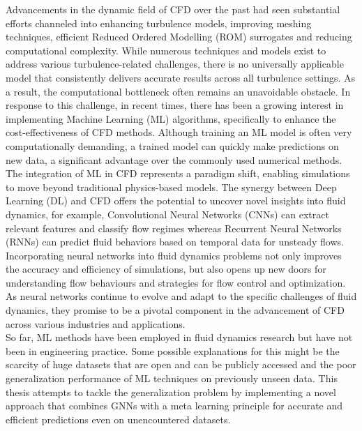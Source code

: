 Advancements in the dynamic field of CFD over the past had seen substantial efforts channeled into enhancing turbulence models, improving meshing techniques, efficient Reduced Ordered Modelling (ROM) surrogates and reducing computational complexity. While numerous techniques and models exist to address various turbulence-related challenges, there is no universally applicable model that consistently delivers accurate results across all turbulence settings. As a result, the computational bottleneck often remains an unavoidable obstacle. In response to this challenge, in recent times, there has been a growing interest in implementing Machine Learning (ML) algorithms, specifically to enhance the cost-effectiveness of CFD methods. Although training an ML model is often very computationally demanding, a trained model can quickly make predictions on new data, a significant advantage over the commonly used numerical methods. The integration of ML in CFD represents a paradigm shift, enabling simulations to move beyond traditional physics-based models. The synergy between Deep Learning (DL) and CFD offers the potential to uncover novel insights into fluid dynamics, for example, Convolutional Neural Networks (CNNs) can extract relevant features and classify flow regimes whereas Recurrent Neural Networks (RNNs) can predict fluid behaviors based on temporal data for unsteady flows. Incorporating neural networks into fluid dynamics problems not only improves the accuracy and efficiency of simulations, but also opens up new doors for understanding flow behaviours and strategies for flow control and optimization. As neural networks continue to evolve and adapt to the specific challenges of fluid dynamics, they promise to be a pivotal component in the advancement of CFD across various industries and applications. \\
So far, ML methods have been employed in fluid dynamics research but have not been in engineering practice. Some possible explanations for this might be the scarcity of huge datasets that are open and can be publicly accessed and the poor generalization performance of ML techniques on previously unseen data. This thesis attempts to tackle the generalization problem by implementing a novel approach that combines GNNs with a meta learning principle for accurate and efficient predictions even on unencountered datasets. 

